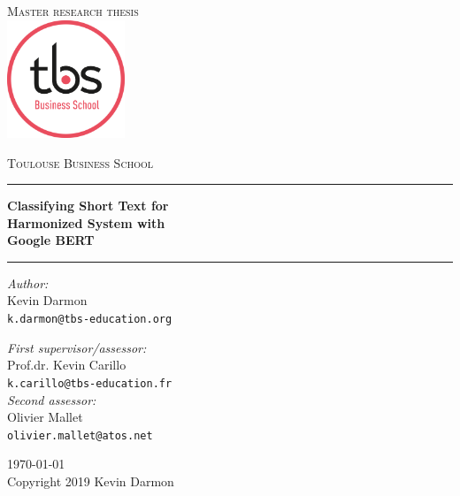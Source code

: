 \documentclass[11pt,a4paper]{report}
\begin{document}
\begin{titlepage}
\begin{center}
\textsc{\LARGE Master research thesis}\\[1.5cm]
\includegraphics[height=100pt]{tbs_logo_2019.png}

\vspace{0.4cm}
\textsc{\Large Toulouse Business School}\\[1cm]
\hrule
\vspace{0.4cm}
\textbf{\huge Classifying Short Text for \\Harmonized System with \\Google BERT\\[0.3cm]
\LARGE }
\hrule
\vspace{2cm}
\begin{minipage}[t]{0.52\textwidth}
\begin{flushleft} \large
\textit{Author:}\\
Kevin Darmon\\
\texttt{k.darmon@tbs-education.org}\\[1.3cm]
\end{flushleft}
\end{minipage}
\begin{minipage}[t]{0.45\textwidth}
\begin{flushright} \large
\textit{First supervisor/assessor:}\\
Prof.dr. Kevin Carillo\\
\texttt{k.carillo@tbs-education.fr}\\[1.3cm]
\textit{Second assessor:}\\
Olivier Mallet\\
\texttt{olivier.mallet@atos.net}
\end{flushright}
\end{minipage}
\vfill
{\large \today}\\
Copyright 2019 Kevin Darmon
\end{center}
\end{titlepage}



\tableofcontents








\appendix

\end{document}
